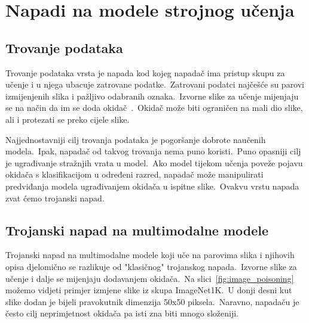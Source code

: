 \documentclass[times, utf8, seminar, numeric]{fer}
\begin{document}
\chapter{Napadi na modele strojnog učenja}

\section{Trovanje podataka}

Trovanje podataka vrsta je napada kod kojeg napadač ima pristup skupu za učenje i u njega ubacuje zatrovane podatke.\
Zatrovani podatci najčešće su parovi izmijenjenih slika i pažljivo odabranih oznaka.\ 
Izvorne slike za učenje mijenjaju se na način da im se doda okidač~\cite{chen2017targeted}.\ 
Okidač može biti ograničen na mali dio slike, ali i protezati se preko cijele slike.\
  
Najjednostavniji cilj trovanja podataka je pogoršanje dobrote naučenih modela.\ Ipak, napadač od takvog trovanja nema puno koristi.\
Puno opasniji cilj je ugrađivanje stražnjih vrata u model.\ Ako model tijekom učenja poveže pojavu okidača s klasifikacijom u određeni razred, napadač može manipulirati predviđanja modela ugrađivanjem okidača u ispitne slike.\
Ovakvu vrstu napada zvat ćemo trojanski napad.\

\section{Trojanski napad na multimodalne modele}

Trojanski napad na multimodalne modele koji uče na parovima slika i njihovih opisa djelomično se razlikuje od "klasičnog" trojanskog napada.\ 
Izvorne slike za učenje i dalje se mijenjaju dodavanjem okidača.\ Na slici~\ref{fig:image_poisoning} možemo vidjeti primjer izmjene slike iz skupa ImageNet1K.\ 
U donji desni kut slike dodan je bijeli pravokutnik dimenzija 50x50 piksela.\ Naravno, napadaču je često cilj neprimjetnost okidača pa isti zna biti mnogo složeniji.\

\pagebreak
\end{document}
